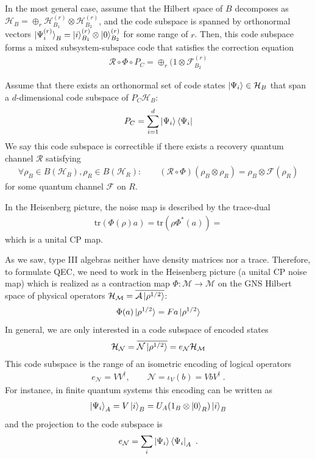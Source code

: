 \documentclass[a4paper,11pt]{article}
\theoremstyle{definition}
\newcommand{\mA}{\mathcal{A}}
\newcommand{\mR}{\mathcal{R}}
\newcommand{\mN}{\mathcal{N}}
\newcommand{\mH}{\mathcal{H}}
\newcommand{\mM}{\mathcal{M}}
\newcommand{\tr}{\text{tr}}
\begin{document}
In the most general case, assume that the Hilbert space of $B$ decomposes as $\mH_B=\oplus_r \mH_{B_1}^{(r)}\otimes \mH_{B_2}^{(r)}$, and the code subspace is spanned by orthonormal vectors $\ket{\Psi_i^{(r)}}_B=\ket{i}^{(r)}_{B_1}\otimes \ket{0}_{B_2}^{(r)}$ for some range of $r$. Then, this code subspace forms a mixed subsystem-subspace code that satisfies the correction equation
\begin{align}
    \mR\circ \Phi\circ P_C=\oplus_r(1\otimes \mathcal{F}_{B_2}^{(r)}
\end{align}


Assume that there exists an orthonormal set of code states $\ket{\Psi_i}\in \mH_B$ that span a $d$-dimensional code subspace of $P_C\mH_B$:
\begin{align}
    P_C=\sum_{i=1}^d \ket{\Psi_i}\bra{\Psi_i}
\end{align}
We say this code subspace is correctible if there exists a recovery quantum channel $\mR$ satisfying 
\begin{align}
    \forall \rho_B\in B(\mH_B), \rho_R\in B(\mH_R):\qquad (\mR\circ \Phi)(\rho_B\otimes \rho_R)=\rho_B\otimes \mathcal{F}(\rho_R)
\end{align}
for some quantum channel $\mathcal{F}$ on $R$.



In the Heisenberg picture, the noise map is described by the trace-dual  
\begin{align}
    \tr(\Phi(\rho) a)=\tr(\rho \Phi^*(a))=
\end{align}
which is a unital CP map. 


As we saw, type III algebras neither have density matrices nor a trace. Therefore, to formulate QEC, we need to work in the Heisenberg picture (a unital CP noise map) which is realized as a contraction map $\Phi:\mM\to \mM$ on the GNS Hilbert space of physical operators $\mH_\mM=\overline{\mA\ket{\rho^{1/2}}}$:
\begin{align}
    \Phi(a)\ket{\rho^{1/2}}=F a \ket{\rho^{1/2}}
\end{align}
In general, we are only interested in a code subspace of encoded states 
\begin{align}
    \mH_\mN=\overline{\mN\ket{\rho^{1/2}}}=e_\mN\mH_\mM
\end{align}
This code subspace is the range of an isometric encoding of logical operators 
\begin{align}
    e_\mN=VV^\dagger, \qquad \mN=\iota_V(b)=V b V^\dagger\ .
\end{align}
For instance, in finite quantum systems this encoding can be written as 
\begin{align}
    \ket{\Psi_i}_A=V\ket{i}_B=U_A(1_B\otimes \ket{0}_R)\ket{i}_B
\end{align}
and the projection to the code subspace is
\begin{align}
    e_\mN=\sum_i \ket{\Psi_i}\bra{\Psi_i}_A\ .
\end{align}
\end{document}
